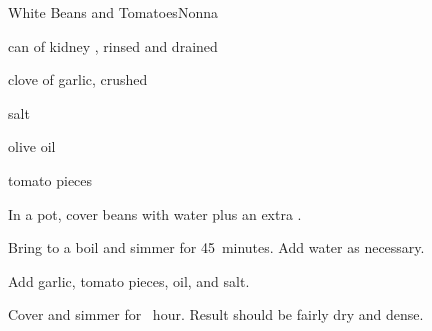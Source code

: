 \begin{recipe}{White Beans and Tomatoes}{Nonna}{}

\begin{ingredients}
\item can of kidney , rinsed and drained
\item clove of garlic, crushed
\item salt
\item olive oil
\item tomato pieces
\end{ingredients}

\begin{directions}
\item In a pot, cover beans with water plus an extra .
\item Bring to a boil and simmer for 45~minutes. Add water as necessary.
\item Add garlic, tomato pieces, oil, and salt.
\item Cover and simmer for \half~hour. Result should be fairly dry and dense.
\end{directions}

\end{recipe}
